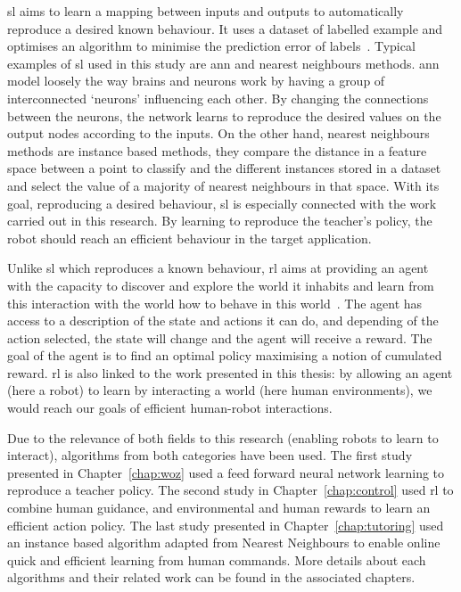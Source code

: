 \gls{sl} aims to learn a mapping between inputs and outputs to automatically reproduce a desired known behaviour. It uses a dataset of labelled example and optimises an algorithm to minimise the prediction error of labels~\citep{russell2016artificial}. Typical examples of \gls{sl} used in this study are \gls{ann} and nearest neighbours methods. \gls{ann} model loosely the way brains and neurons work by having a group of interconnected `neurons' influencing each other. By changing the connections between the neurons, the network learns to reproduce the desired values on the output nodes according to the inputs. On the other hand, nearest neighbours methods are instance based methods, they compare the distance in a feature space between a point to classify and the different instances stored in a dataset and select the value of a majority of nearest neighbours in that space. With its goal, reproducing a desired behaviour, \gls{sl} is especially connected with the work carried out in this research. By learning to reproduce the teacher's policy, the robot should reach an efficient behaviour in the target application.

Unlike \gls{sl} which reproduces a known behaviour, \gls{rl} aims at providing an agent with the capacity to discover and explore the world it inhabits and learn from this interaction with the world how to behave in this world~\citep{sutton1998reinforcement}. The agent has access to a description of the state and actions it can do, and depending of the action selected, the state will change and the agent will receive a reward. The goal of the agent is to find an optimal policy maximising a notion of cumulated reward. \gls{rl} is also linked to the work presented in this thesis: by allowing an agent (here a robot) to learn by interacting a world (here human environments), we would reach our goals of efficient human-robot interactions.

Due to the relevance of both fields to this research (enabling robots to learn to interact), algorithms from both categories have been used. The first study presented in Chapter~\ref{chap:woz} used a feed forward neural network learning to reproduce a teacher policy. The second study in Chapter~\ref{chap:control} used \gls{rl} to combine human guidance, and environmental and human rewards to learn an efficient action policy. The last study presented in Chapter~\ref{chap:tutoring} used an instance based algorithm adapted from Nearest Neighbours to enable online quick and efficient learning from human commands. More details about each algorithms and their related work can be found in the associated chapters.

